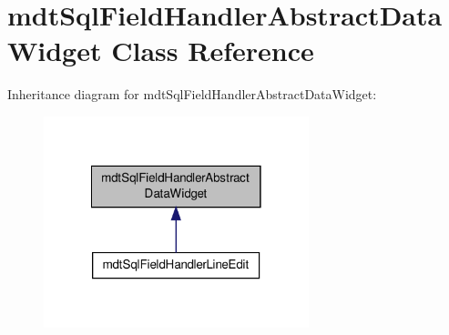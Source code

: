 \hypertarget{classmdt_sql_field_handler_abstract_data_widget}{\section{mdt\-Sql\-Field\-Handler\-Abstract\-Data\-Widget Class Reference}
\label{classmdt_sql_field_handler_abstract_data_widget}
}


Inheritance diagram for mdt\-Sql\-Field\-Handler\-Abstract\-Data\-Widget\-:
\nopagebreak
\begin{figure}[H]
\begin{center}
\leavevmode
\includegraphics[width=218pt]{classmdt_sql_field_handler_abstract_data_widget__inherit__graph}
\end{center}
\end{figure}

